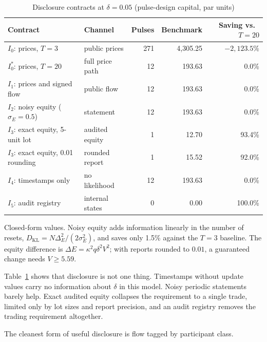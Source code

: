 \documentclass[12pt]{article}
\theoremstyle{definition}
\theoremstyle{remark}
\newcommand{\KL}{D_{\mathrm{KL}}}
\begin{document}
\begin{table}[t]\centering\small
\begin{threeparttable}
\caption{Disclosure contracts at $\delta=0.05$ (pulse-design capital, par units)}\label{tab:contracts}
\begin{tabular}{llrrr}
\toprule
Contract & Channel & Pulses & Benchmark & Saving vs.\ $T=20$\\
\midrule
$I_0$: prices, $T=3$ & public prices & 271 & 4{,}305.25 & $-2{,}123.5\%$\\
$I_0^*$: prices, $T=20$ & full price path & 12 & 193.63 & 0.0\%\\
$I_1$: prices and signed flow & public flow & 12 & 193.63 & 0.0\%\\
$I_2$: noisy equity ($\sigma_E=0.5$) & statement & 12 & 193.63 & 0.0\%\\
$I_3$: exact equity, 5-unit lot & audited equity & 1 & 12.70 & 93.4\%\\
$I_3$: exact equity, 0.01 rounding & rounded report & 1 & 15.52 & 92.0\%\\
$I_4$: timestamps only & no likelihood & 12 & 193.63 & 0.0\%\\
$I_5$: audit registry & internal states & 0 & 0.00 & 100.0\%\\
\bottomrule
\end{tabular}
\begin{tablenotes}\footnotesize\item Closed-form values. Noisy equity adds information linearly in the number of resets, $\KL=N\Delta_E^2/(2\sigma_E^2)$, and saves only 1.5\% against the $T=3$ baseline. The equity difference is $\Delta E=\kappa^2q\delta^2V^2$; with reports rounded to $0.01$, a guaranteed change needs $V\ge5.59$.\end{tablenotes}
\end{threeparttable}
\end{table}

Table~\ref{tab:contracts} shows that disclosure is not one thing. Timestamps without update values carry no information about $\delta$ in this model. Noisy periodic statements barely help. Exact audited equity collapses the requirement to a single trade, limited only by lot sizes and report precision, and an audit registry removes the trading requirement altogether.

The cleanest form of useful disclosure is flow tagged by participant class.
\end{document}
